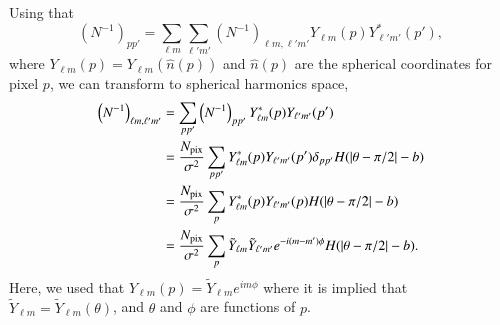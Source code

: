 \documentclass[twocolumn]{../common/aa}
\begin{document}
Using that
$$
\left(N^{-1}\right)_{pp'} = \sum_{\ell m}\sum_{\ell' m'} \left(N^{-1}\right)_{\ell m, \ell'm'} Y_{\ell m}\left(p\right)Y^*_{\ell' m'}\left(p'\right),
$$
where $Y_{\ell m}\left(p\right) = Y_{\ell m}\left(\hat{n}(p)\right)$ and $\hat{n}(p)$ are the spherical coordinates for pixel $p$, we can transform to spherical harmonics space,
\begin{align}
\nonumber
\left(N^{-1}\right)_{\ell m, \ell' m'} &= \sum_{p p'}\left(N^{-1}\right)_{pp'}Y^{*}_{\ell m}(p)Y_{\ell' m'}(p')\\
\nonumber
&= \frac{N_{\mathrm{pix}}}{\sigma^2}\sum_{p p'} Y^{*}_{\ell m}(p)Y_{\ell' m'}(p') \delta_{pp'} H(|\theta -\pi/2|-b)\\
\nonumber
&= \frac{N_{\mathrm{pix}}}{\sigma^2}\sum_{p } Y^{*}_{\ell m}(p)Y_{\ell' m'}(p) H(|\theta -\pi/2|-b)\\
&= \frac{N_{\mathrm{pix}}}{\sigma^2}\sum_p \Tilde{Y}_{\ell m}\Tilde{Y}_{\ell' m'} e^{-i(m-m')\phi} H(|\theta -\pi/2|-b).
\end{align}
Here, we used that $Y_{\ell m}(p) = \tilde{Y}_{\ell m} e^{im\phi}$ where it is implied that $\tilde{Y}_{\ell m}=\tilde{Y}_{\ell m}(\theta)$, and $\theta$ and $\phi$ are functions of $p$.
\end{document}
